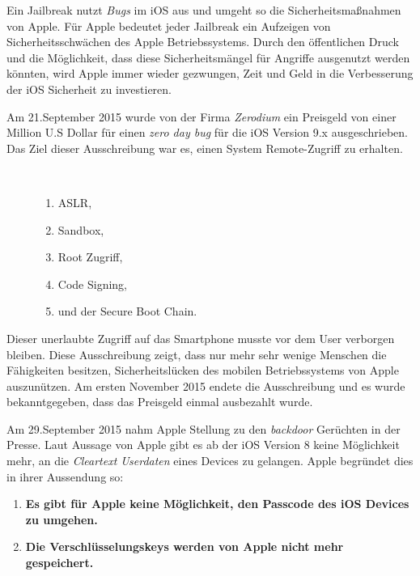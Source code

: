 Ein Jailbreak nutzt \textit{\glqq Bugs\grqq{}} im iOS aus und umgeht so die Sicherheitsmaßnahmen von Apple. Für Apple bedeutet jeder Jailbreak ein Aufzeigen von Sicherheitsschwächen des Apple Betriebssystems. Durch den öffentlichen Druck und die Möglichkeit, dass diese Sicherheitsmängel für Angriffe ausgenutzt werden könnten, wird Apple immer wieder gezwungen, Zeit und Geld in die Verbesserung der iOS Sicherheit zu investieren. 

Am 21.September 2015 wurde von der Firma \textit{\glqq Zerodium\grqq{}} ein Preisgeld von einer Million U.S Dollar für einen \textit{\glqq zero day bug\grqq{}} für die iOS Version 9.x ausgeschrieben. Das Ziel dieser Ausschreibung war es, einen System Remote-Zugriff zu erhalten. 
\begin{description}
    \item[\parbox{\textwidth} {Folgende iOS Sicherheitsmechanismen mussten durch diesen Jailbreak umgangen werden}]~\par
    \begin{enumerate}
        \item ASLR, 
        \item Sandbox,
        \item Root Zugriff, 
        \item Code Signing, 
        \item und der Secure Boot Chain.
    \end{enumerate}
\end{description} 

Dieser unerlaubte Zugriff auf das Smartphone musste vor dem User verborgen bleiben. Diese Ausschreibung zeigt, dass nur mehr sehr wenige Menschen die Fähigkeiten besitzen, Sicherheitslücken des mobilen Betriebssystems von Apple auszunützen. Am ersten November 2015 endete die Ausschreibung und es wurde bekanntgegeben, dass das Preisgeld einmal ausbezahlt wurde. 

Am 29.September 2015 nahm Apple Stellung  zu den \textit{\glqq backdoor\grqq{}} Gerüchten in der Presse. Laut Aussage von Apple gibt es ab der iOS Version 8 keine Möglichkeit mehr, an die \textit{\glqq Cleartext Userdaten\grqq{}} eines Devices zu gelangen. Apple begründet dies in ihrer Aussendung so:
\begin{enumerate}
    \item \textbf{Es gibt für Apple keine Möglichkeit, den Passcode des iOS Devices zu umgehen.}
    \item \textbf{Die Verschlüsselungskeys werden von Apple nicht mehr gespeichert.}
\end{enumerate}

